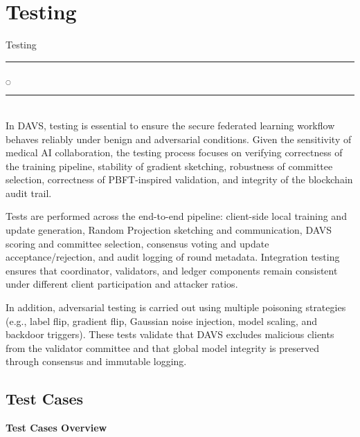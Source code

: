 
\chapter[Testing]{Testing}{Testing}\label{Test}
\noindent
\rule{0.49\textwidth}{0.75pt} $_{\bigcirc}$ \rule{0.49\textwidth}{0.75pt}\\
In DAVS, testing is essential to ensure the secure federated learning workflow behaves reliably under benign and adversarial conditions. Given the sensitivity of medical AI collaboration, the testing process focuses on verifying correctness of the training pipeline, stability of gradient sketching, robustness of committee selection, correctness of PBFT-inspired validation, and integrity of the blockchain audit trail.

Tests are performed across the end-to-end pipeline: client-side local training and update generation, Random Projection sketching and communication, DAVS scoring and committee selection, consensus voting and update acceptance/rejection, and audit logging of round metadata. Integration testing ensures that coordinator, validators, and ledger components remain consistent under different client participation and attacker ratios.

In addition, adversarial testing is carried out using multiple poisoning strategies (e.g., label flip, gradient flip, Gaussian noise injection, model scaling, and backdoor triggers). These tests validate that DAVS excludes malicious clients from the validator committee and that global model integrity is preserved through consensus and immutable logging.
\\
\noindent

\section{Test Cases}



\renewcommand{\arraystretch}{1.1}
\begin{center}
\textbf{Test Cases Overview}
\end{center}

